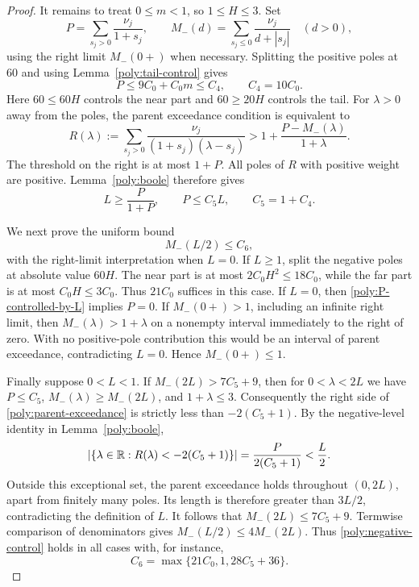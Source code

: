 \begin{proof}
It remains to treat $0\leq m<1$, so $1\leq H\leq3$. Set
\[
 P=\sum_{s_j>0}\frac{\nu_j}{1+s_j},\qquad
 M_-(d)=\sum_{s_j\leq0}\frac{\nu_j}{d+|s_j|}\quad(d>0),
\]
using the right limit $M_-(0+)$ when necessary. Splitting the positive
poles at $60$ and using Lemma~\ref{poly:tail-control} gives
\begin{equation}\label{poly:P-bound}
 P\leq9C_0+C_0m\leq C_4,
 \qquad C_4=10C_0.
\end{equation}
Here $60\leq60H$ controls the near part and $60\geq20H$ controls
the tail. For $\lambda>0$ away from the poles, the parent exceedance
condition is equivalent to
\begin{equation}\label{poly:parent-exceedance}
 R(\lambda):=\sum_{s_j>0}
 \frac{\nu_j}{(1+s_j)(\lambda-s_j)}
 >1+\frac{P-M_-(\lambda)}{1+\lambda}.
\end{equation}
The threshold on the right is at most $1+P$. All poles of $R$ with
positive weight are positive. Lemma~\ref{poly:boole} therefore gives
\begin{equation}\label{poly:P-controlled-by-L}
 L\geq\frac{P}{1+P},\qquad
 P\leq C_5L,\qquad C_5=1+C_4.
\end{equation}

We next prove the uniform bound
\begin{equation}\label{poly:negative-control}
 M_-(L/2)\leq C_6,
\end{equation}
with the right-limit interpretation when $L=0$. If $L\geq1$, split
the negative poles at absolute value $60H$. The near part is at most
$2C_0H^2\leq18C_0$, while the far part is at most $C_0H\leq3C_0$.
Thus $21C_0$ suffices in this case. If $L=0$, then
\eqref{poly:P-controlled-by-L} implies $P=0$. If $M_-(0+)>1$,
including an infinite right limit, then
$M_-(\lambda)>1+\lambda$ on a nonempty interval immediately to the
right of zero. With no positive-pole contribution this would be an
interval of parent exceedance, contradicting $L=0$. Hence
$M_-(0+)\leq1$.

Finally suppose $0<L<1$. If
$M_-(2L)>7C_5+9$, then for $0<\lambda<2L$ we have
$P\leq C_5$, $M_-(\lambda)\geq M_-(2L)$, and $1+\lambda\leq3$.
Consequently the right side of \eqref{poly:parent-exceedance} is
strictly less than $-2(C_5+1)$. By the negative-level identity in
Lemma~\ref{poly:boole},
\[
 \left|\{\lambda\in\mathbb R:R(\lambda)<-2(C_5+1)\}\right|
 =\frac{P}{2(C_5+1)}<\frac L2.
\]
Outside this exceptional set, the parent exceedance holds throughout
$(0,2L)$, apart from finitely many poles. Its length is therefore
greater than $3L/2$, contradicting the definition of $L$. It follows
that $M_-(2L)\leq7C_5+9$. Termwise comparison of denominators gives
$M_-(L/2)\leq4M_-(2L)$. Thus
\eqref{poly:negative-control} holds in all cases with, for instance,
\begin{equation}\label{poly:C6-choice}
 C_6=\max\{21C_0,1,28C_5+36\}.
\end{equation}


\end{proof}
